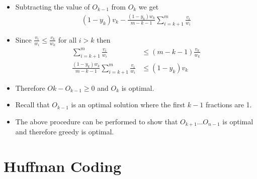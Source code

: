 \documentclass{beamer}
\begin{document}
\begin{frame}
  \begin{itemize}
  \item Subtracting the value of $O_{k-1}$ from $O_k$ we get
    \begin{align*}
      (1-y_k)v_k-\frac{(1-y_k)w_k}{m-k-1}\sum_{i=k+1}^m\frac{v_i}{w_i}
    \end{align*}
\item Since $\frac{v_i}{w_i}\le\frac{v_k}{w_k}$ for all $i>k$ then 
  \begin{align*}
    \sum_{i=k+1}^{m}\frac{v_i}{w_i}&\le (m-k-1)\frac{v_k}{w_k}\\
\frac{(1-y_k)w_k}{m-k-1}\sum_{i=k+1}^m\frac{v_i}{w_i}&\le (1-y_k)v_k
  \end{align*}
\item Therefore $Ok-O_{k-1}\ge 0$ and $O_k$ is optimal.
  \end{itemize}
\end{frame}

\begin{frame}
  \begin{itemize}
  \item Recall that $O_{k-1}$ is an optimal solution where the first $k-1$ fractions are 1.
  \item The above procedure can be performed to show that $O_{k+1}\ldots O_{n-1}$ is optimal and therefore greedy is optimal.
  \end{itemize}
\end{frame}
\section{Huffman Coding}
\end{document}
